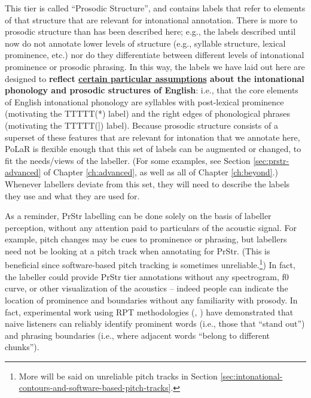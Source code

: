 \documentclass[11pt, twoside]{memoir}
\begin{document}
\begin{infobox}[frametitle=\textbf{A side-note about this tier}]
This tier is called “Prosodic Structure”, and contains labels that refer to elements of that structure that are relevant for intonational annotation. There is more to prosodic structure than has been described here; e.g., the labels described until now do not annotate lower levels of structure (e.g., syllable structure, lexical prominence, etc.) nor do they differentiate between different levels of intonational prominence or prosodic phrasing. In this way, the labels we have laid out here are designed to \textbf{reflect \uline{certain particular assumptions} about the intonational phonology and prosodic structures of English}: i.e., that the core elements of English intonational phonology are syllables with post-lexical prominence (motivating the TTTTT(*) label) and the right edges of phonological phrases (motivating the TTTTT(]) label). Because prosodic structure consists of a superset of these features that are relevant for intonation that we annotate here, PoLaR is flexible enough that this set of labels can be augmented or changed, to fit the needs\slash views of the labeller. (For some examples, see Section \ref{sec:prstr-advanced} of Chapter \ref{ch:advanced}, as well as all of Chapter \ref{ch:beyond}.) Whenever labellers deviate from this set, they will need to describe the labels they use and what they are used for.
\end{infobox}

As a reminder, PrStr labelling can be done solely on the basis of labeller perception, without any attention paid to particulars of the acoustic signal. For example, pitch changes may be cues to prominence or phrasing, but labellers need not be looking at a pitch track when annotating for PrStr. (This is beneficial since software-based pitch tracking is sometimes unreliable.\footnote{More will be said on unreliable pitch tracks in Section \ref{sec:intonational-contours-and-software-based-pitch-tracks}.}) In fact, the labeller could provide PrStr tier annotations without any spectrogram, f0 curve, or other visualization of the acoustics – indeed people can indicate the location of prominence and boundaries without any familiarity with prosody. In fact, experimental work using RPT methodologies (\citealt{cole-14, cole-17}, \citealt{cole-16}) have demonstrated that naive listeners can reliably identify prominent words (i.e., those that “stand out”) and phrasing boundaries (i.e., where adjacent words “belong to different chunks”).
\end{document}
